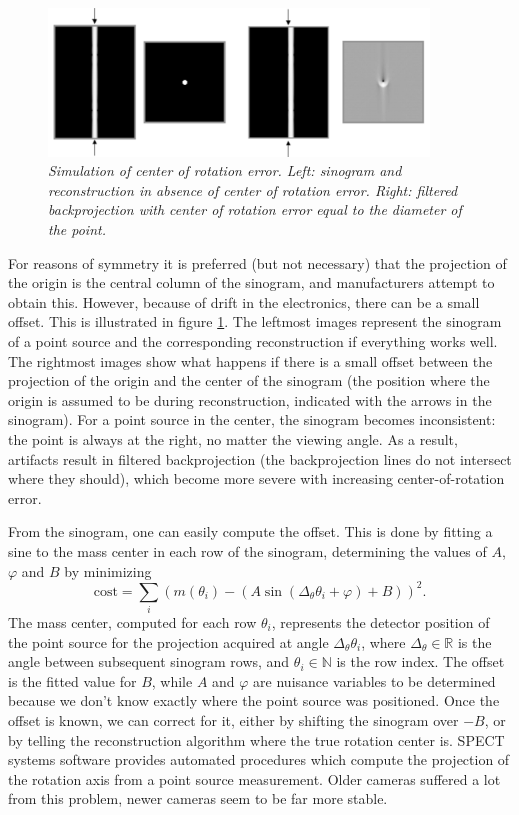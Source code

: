 \documentclass[11pt,oneside]{article}
\begin{document}
\begin{figure}[t]
\centering
\includegraphics[width=0.9\textwidth]{figs/fig_cor.pdf}
\caption{\label{fig:cor} \emph{Simulation of center of rotation error. Left:
sinogram and reconstruction in absence of center of rotation error. Right:
filtered backprojection with center of rotation error equal to the diameter of
the point.}}
\end{figure}
%
For reasons of symmetry it is preferred (but not necessary) that the
projection of the origin is the central column of the sinogram, and
manufacturers attempt to obtain this. However, because of drift in the
electronics, there can be a small offset. This is illustrated in figure
\ref{fig:cor}. The leftmost images represent the sinogram of a point source
and the corresponding reconstruction if everything works well. The rightmost
images show what happens if there is a small offset between the projection of
the origin and the center of the sinogram (the position where the origin is
assumed to be during reconstruction, indicated with the arrows in the
sinogram). For a point source in the center, the sinogram becomes
inconsistent: the point is always at the right, no matter the viewing
angle. As a result, artifacts result in filtered backprojection (the
backprojection lines do not intersect where they should), which become more
severe with increasing center-of-rotation error.

From the sinogram, one can easily compute the offset. This is done by
fitting a sine to the mass center in each row of the sinogram,
determining the values of $A$, $\varphi$ and $B$ by minimizing
\begin{equation}
 \mbox{cost} = 
  \sum_i \left(m(\theta_i) 
           - (A \sin(\Delta_\theta \theta_i + \varphi) + B)\right)^2.
\end{equation}
The mass center, computed for each row $\theta_i$, represents the
detector position of the point source for the projection acquired at
angle $\Delta_\theta \theta_i$, where $\Delta_\theta \in \mathbb{R}$ is the
angle between subsequent sinogram rows, and $\theta_i \in \mathbb{N}$ is the
row index. The offset is the fitted value for $B$, while $A$ and
$\varphi$ are nuisance variables to be determined because we don't
know exactly where the point source was positioned. Once the offset is
known, we can correct for it, either by shifting the sinogram over $-B$,
or by telling the reconstruction algorithm where the true rotation
center is. SPECT systems software provides automated procedures which
compute the projection of the rotation axis from a point source
measurement. Older cameras suffered a lot from this problem, newer
cameras seem to be far more stable.
\end{document}
